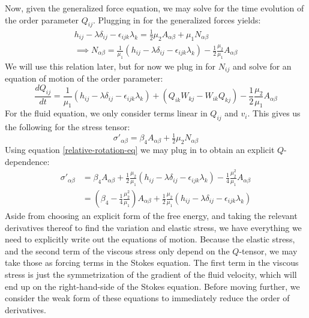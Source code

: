 \documentclass[reqno]{article}
\begin{document}
  Now, given the generalized force equation, we may solve for the time
  evolution of the order parameter $Q_{ij}$.
  Plugging in for the generalized forces yields:
  \begin{equation} \label{relative-rotation-eq}
    \begin{split}
    h_{ij} - \lambda \delta_{ij} - \epsilon_{ijk} \lambda_k
    = \tfrac12 \mu_2 A_{\alpha \beta}
    + \mu_1 N_{\alpha \beta} \\
    \implies
    N_{\alpha \beta}
    =
    \frac{1}{\mu_1}
    \left(
      h_{ij} - \lambda \delta_{ij} - \epsilon_{ijk} \lambda_k
    \right)
    - \frac12 \frac{\mu_2}{\mu_1} A_{\alpha \beta}
    \end{split}
  \end{equation}
  We will use this relation later, but for now we plug in for $N_{ij}$ and solve
  for an equation of motion of the order parameter:
  \begin{equation}
    \frac{d Q_{ij}}{dt}
    =
    \frac{1}{\mu_1}
    \left(
      h_{ij} - \lambda \delta_{ij} - \epsilon_{ijk} \lambda_k
    \right)
    +
    \left(
      Q_{ik} W_{kj} - W_{ik} Q_{kj}
    \right)
    - \frac12 \frac{\mu_2}{\mu_1} A_{\alpha \beta}
  \end{equation}
  For the fluid equation, we only consider terms linear in $Q_{ij}$ and $v_i$.
  This gives us the following for the stress tensor:
  \begin{equation}
    \sigma'_{\alpha \beta}
    =
    \beta_4 A_{\alpha \beta}
    + \tfrac12 \mu_2 N_{\alpha \beta}
  \end{equation}
  Using equation \eqref{relative-rotation-eq} we may plug in to obtain an
  explicit $Q$-dependence:
  \begin{equation}
    \begin{split}
    \sigma'_{\alpha \beta}
    &=
    \beta_4 A_{\alpha \beta}
    + \frac12 \frac{\mu_2}{\mu_1} \left( h_{ij} - \lambda \delta_{ij} - \epsilon_{ijk} \lambda_k \right)
    - \frac14 \frac{\mu_2^2}{\mu_1} A_{\alpha \beta} \\
    &= \left( \beta_4 - \frac14 \frac{\mu_2^2}{\mu_1} \right) A_{\alpha \beta}
    + \frac12 \frac{\mu_2}{\mu_1} \left( h_{ij} - \lambda \delta_{ij} - \epsilon_{ijk} \lambda_k \right)
    \end{split}
  \end{equation}
  Aside from choosing an explicit form of the free energy, and taking the
  relevant derivatives thereof to find the variation and elastic stress, we have
  everything we need to explicitly write out the equations of motion.
  Because the elastic stress, and the second term of the viscous stress only
  depend on the $Q$-tensor, we may take those as forcing terms in the Stokes
  equation.
  The first term in the viscous stress is just the symmetrization of the
  gradient of the fluid velocity, which will end up on the right-hand-side of
  the Stokes equation.
  Before moving further, we consider the weak form of these equations to
  immediately reduce the order of derivatives.
\end{document}
